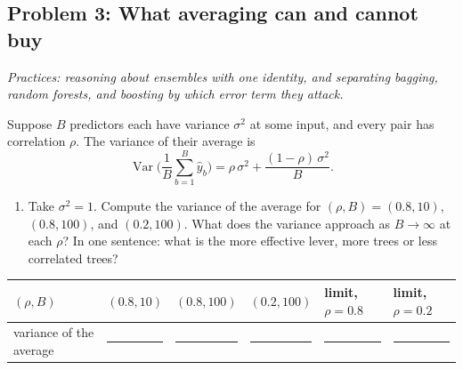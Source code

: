 \documentclass[
  11pt,
]{article}
\newcounter{none} %
\providecommand{\tightlist}{%
  \setlength{\itemsep}{0pt}\setlength{\parskip}{0pt}}
\newcommand{\answerspace}[1]{\par\vspace*{#1}}  %
\newcommand{\blank}[1][1.2in]{\rule{#1}{0.4pt}}
\newcommand{\answerpage}{\clearpage}
\begin{document}
\answerspace{2.2in}

\answerpage

\subsection{Problem 3: What averaging can and cannot
buy}\label{problem-3-what-averaging-can-and-cannot-buy}

\emph{Practices: reasoning about ensembles with one identity, and
separating bagging, random forests, and boosting by which error term
they attack.}

Suppose \(B\) predictors each have variance \(\sigma^2\) at some input,
and every pair has correlation \(\rho\). The variance of their average
is
\[\operatorname{Var}\!\Big(\frac{1}{B}\sum_{b=1}^{B}\hat y_b\Big) = \rho\,\sigma^2 + \frac{(1-\rho)\,\sigma^2}{B}.\]

\begin{enumerate}
\def\labelenumi{(\alph{enumi})}
\tightlist
\item
  Take \(\sigma^2 = 1\). Compute the variance of the average for
  \((\rho, B) = (0.8, 10)\), \((0.8, 100)\), and \((0.2, 100)\). What
  does the variance approach as \(B \to \infty\) at each \(\rho\)? In
  one sentence: what is the more effective lever, more trees or less
  correlated trees?
\end{enumerate}

{\def\LTcaptype{none} %
\begin{longtable}[]{@{}
  >{\raggedright\arraybackslash}p{}
  >{\raggedright\arraybackslash}p{}
  >{\raggedright\arraybackslash}p{}
  >{\raggedright\arraybackslash}p{}
  >{\raggedright\arraybackslash}p{}
  >{\raggedright\arraybackslash}p{}@{}}
\toprule\noalign{}
\begin{minipage}[b]{\linewidth}\raggedright
\((\rho, B)\)
\end{minipage} & \begin{minipage}[b]{\linewidth}\raggedright
\((0.8, 10)\)
\end{minipage} & \begin{minipage}[b]{\linewidth}\raggedright
\((0.8, 100)\)
\end{minipage} & \begin{minipage}[b]{\linewidth}\raggedright
\((0.2, 100)\)
\end{minipage} & \begin{minipage}[b]{\linewidth}\raggedright
limit, \(\rho = 0.8\)
\end{minipage} & \begin{minipage}[b]{\linewidth}\raggedright
limit, \(\rho = 0.2\)
\end{minipage} \\
\midrule\noalign{}
\endhead
\bottomrule\noalign{}
\endlastfoot
variance of the average & \blank[0.8in] & \blank[0.8in] & \blank[0.8in]
& \blank[0.8in] & \blank[0.8in] \\
\end{longtable}
}
\end{document}
